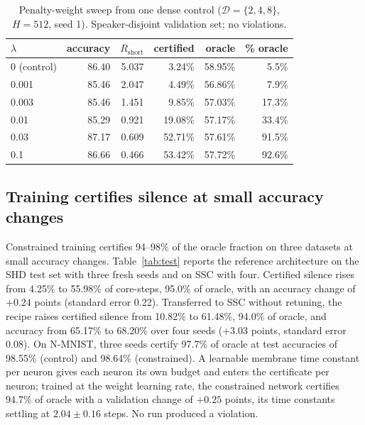 \documentclass{iopjournal}
\begin{document}
\begin{table}
\caption{\label{tab:sweep}Penalty-weight sweep from one dense control ($\mathcal{D}=\{2,4,8\}$, $H=512$, seed 1). Speaker-disjoint validation set; no violations.}
\centering
\begin{tabular}{lrrrrr}
\hline
$\lambda$ & accuracy & $R_{\mathrm{short}}$ & certified & oracle & \% oracle \\
\hline
0 (control)  & 86.40 & 5.037 & 3.24\%  & 58.95\% & 5.5\%  \\
0.001        & 85.46 & 2.047 & 4.49\%  & 56.86\% & 7.9\%  \\
0.003        & 85.46 & 1.451 & 9.85\%  & 57.03\% & 17.3\% \\
0.01         & 85.29 & 0.921 & 19.08\% & 57.17\% & 33.4\% \\
0.03         & 87.17 & 0.609 & 52.71\% & 57.61\% & 91.5\% \\
0.1          & 86.66 & 0.466 & 53.42\% & 57.72\% & 92.6\% \\
\hline
\end{tabular}
\end{table}

\subsection{Training certifies silence at small accuracy changes}
\label{sec:accuracy}

Constrained training certifies 94--98\% of the oracle fraction on three datasets at small accuracy changes. Table~\ref{tab:test} reports the reference architecture on the SHD test set with three fresh seeds and on SSC with four. Certified silence rises from 4.25\% to 55.98\% of core-steps, 95.0\% of oracle, with an accuracy change of $+0.24$ points (standard error 0.22). Transferred to SSC without retuning, the recipe raises certified silence from 10.82\% to 61.48\%, 94.0\% of oracle, and accuracy from 65.17\% to 68.20\% over four seeds ($+3.03$ points, standard error 0.08). On N-MNIST, three seeds certify 97.7\% of oracle at test accuracies of 98.55\% (control) and 98.64\% (constrained). A learnable membrane time constant per neuron gives each neuron its own budget and enters the certificate per neuron; trained at the weight learning rate, the constrained network certifies 94.7\% of oracle with a validation change of $+0.25$ points, its time constants settling at $2.04\pm0.16$ steps. No run produced a violation.
\end{document}
